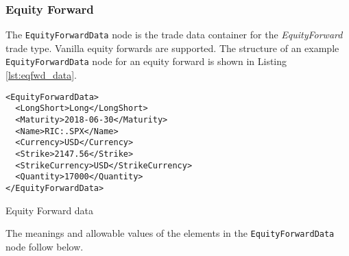 \subsubsection{Equity Forward}

\ifdefined{}\fi

The \lstinline!EquityForwardData!  node is the trade data container for the \emph{EquityForward} trade type.  Vanilla equity 
forwards are supported. The structure of an example \lstinline!EquityForwardData! node for an equity forward is shown in 
Listing \ref{lst:eqfwd_data}.

\begin{listing}[H]
\begin{verbatim}
<EquityForwardData>
  <LongShort>Long</LongShort>
  <Maturity>2018-06-30</Maturity>
  <Name>RIC:.SPX</Name>
  <Currency>USD</Currency>
  <Strike>2147.56</Strike>
  <StrikeCurrency>USD</StrikeCurrency>
  <Quantity>17000</Quantity>
</EquityForwardData>
\end{verbatim}
\caption{Equity Forward data}
\label{lst:eqfwd_data}
\end{listing}

The meanings and allowable values of the elements in the \lstinline!EquityForwardData!  node follow below.

